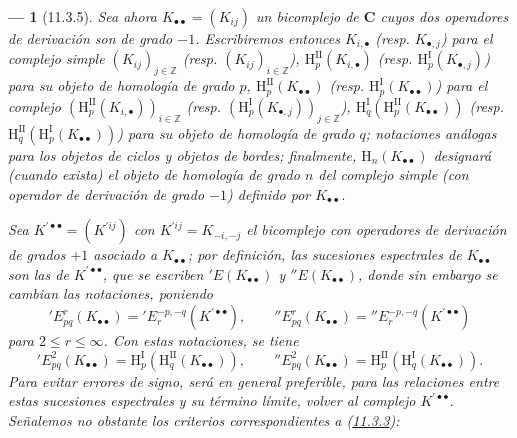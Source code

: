 \documentclass[10pt,oneside,openany]{book}
\theoremstyle{egaenv}\newtheorem*{env}{---}
\theoremstyle{egastatement}
\theoremstyle{egadescription}
\renewcommand{\leq}{\leqslant}
\begin{document}
\begin{env}[11.3.5]
\label{0.11.3.5-fr}
Sea ahora $K_{\bullet\bullet}=(K_{ij})$ un bicomplejo de
$\boldsymbol{C}$ cuyos dos operadores de derivación son de grado $-1$. Escribiremos
entonces $K_{i,\bullet}$ (resp. $K_{\bullet,j}$) para el complejo simple
$(K_{ij})_{j\in\mathbb Z}$ (resp. $(K_{ij})_{i\in\mathbb Z}$),
$\mathrm H_p^{\mathrm{II}}(K_{i,\bullet})$ (resp.
$\mathrm H_p^{\mathrm I}(K_{\bullet,j})$) para su objeto de homología de grado $p$,
$\mathrm H_p^{\mathrm{II}}(K_{\bullet\bullet})$ (resp.
$\mathrm H_p^{\mathrm I}(K_{\bullet\bullet})$) para el complejo
$(\mathrm H_p^{\mathrm{II}}(K_{i,\bullet}))_{i\in\mathbb Z}$ (resp.
$(\mathrm H_p^{\mathrm I}(K_{\bullet,j}))_{j\in\mathbb Z}$),
$\mathrm H_q^{\mathrm I}(\mathrm H_p^{\mathrm{II}}(K_{\bullet\bullet}))$
(resp.
$\mathrm H_q^{\mathrm{II}}(\mathrm H_p^{\mathrm I}(K_{\bullet\bullet}))$)
para su objeto de homología de grado $q$; notaciones análogas para los objetos de ciclos
y objetos de bordes; finalmente, $\mathrm H_n(K_{\bullet\bullet})$ designará
(cuando exista) el objeto de homología de grado $n$ del complejo simple (con
operador de derivación de grado $-1$) definido por $K_{\bullet\bullet}$.

Sea $K^{\prime\bullet\bullet}=(K^{\prime ij})$ con
$K^{\prime ij}=K_{-i,-j}$ el bicomplejo con operadores de derivación de grados
$+1$ asociado a $K_{\bullet\bullet}$; por definición, las
\emph{sucesiones espectrales} de $K_{\bullet\bullet}$ son las de
$K^{\prime\bullet\bullet}$, que se escriben $'E(K_{\bullet\bullet})$ y
$''E(K_{\bullet\bullet})$, donde sin embargo se cambian las notaciones, poniendo
\[
  'E_{pq}^r(K_{\bullet\bullet})
  ='E_r^{-p,-q}(K^{\prime\bullet\bullet}),\qquad
  ''E_{pq}^r(K_{\bullet\bullet})
  =''E_r^{-p,-q}(K^{\prime\bullet\bullet})
\]
para $2\leq r\leq\infty$. Con estas notaciones, se tiene
\[
  'E_{pq}^2(K_{\bullet\bullet})
  =\mathrm H_p^{\mathrm I}(\mathrm H_q^{\mathrm{II}}(K_{\bullet\bullet})),
  \qquad
  ''E_{pq}^2(K_{\bullet\bullet})
  =\mathrm H_p^{\mathrm{II}}(\mathrm H_q^{\mathrm I}(K_{\bullet\bullet})).
\]
Para evitar errores de signo, será en general preferible, para las
relaciones entre estas sucesiones espectrales y su término límite, volver al
complejo $K^{\prime\bullet\bullet}$. Señalemos no obstante los criterios
correspondientes a (\hyperref[0.11.3.3-fr]{11.3.3}):
\end{env}
\end{document}
